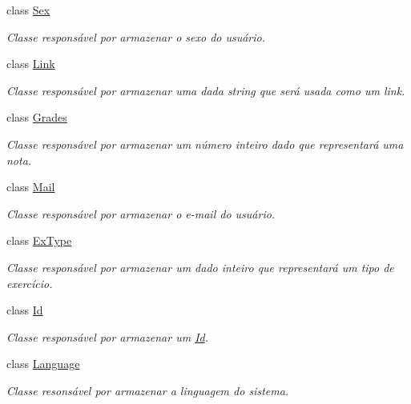 \begin{DoxyCompactItemize}
class \hyperlink{classELO_1_1BaseUnit_1_1Sex}{Sex}
\begin{DoxyCompactList}\small\item\em Classe responsável por armazenar o sexo do usuário. \end{DoxyCompactList}\item 
class \hyperlink{classELO_1_1BaseUnit_1_1Link}{Link}
\begin{DoxyCompactList}\small\item\em Classe responsável por armazenar uma dada string que será usada como um link. \end{DoxyCompactList}\item 
class \hyperlink{classELO_1_1BaseUnit_1_1Grades}{Grades}
\begin{DoxyCompactList}\small\item\em Classe responsável por armazenar um número inteiro dado que representará uma nota. \end{DoxyCompactList}\item 
class \hyperlink{classELO_1_1BaseUnit_1_1Mail}{Mail}
\begin{DoxyCompactList}\small\item\em Classe responsável por armazenar o e-\/mail do usuário. \end{DoxyCompactList}\item 
class \hyperlink{classELO_1_1BaseUnit_1_1ExType}{Ex\-Type}
\begin{DoxyCompactList}\small\item\em Classe responsável por armazenar um dado inteiro que representará um tipo de exercício. \end{DoxyCompactList}\item 
class \hyperlink{classELO_1_1BaseUnit_1_1Id}{Id}
\begin{DoxyCompactList}\small\item\em Classe responsável por armazenar um \hyperlink{classELO_1_1BaseUnit_1_1Id}{Id}. \end{DoxyCompactList}\item 
class \hyperlink{classELO_1_1BaseUnit_1_1Language}{Language}
\begin{DoxyCompactList}\small\item\em Classe resonsável por armazenar a linguagem do sistema. \end{DoxyCompactList}\end{DoxyCompactItemize}

